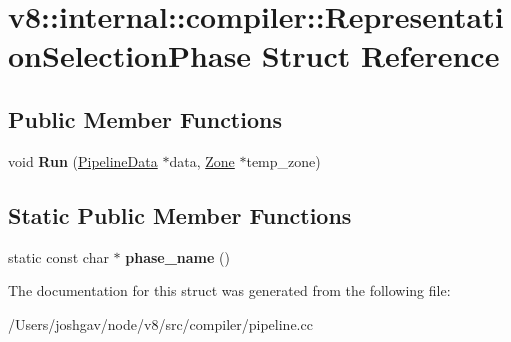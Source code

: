 \hypertarget{structv8_1_1internal_1_1compiler_1_1_representation_selection_phase}{}\section{v8\+:\+:internal\+:\+:compiler\+:\+:Representation\+Selection\+Phase Struct Reference}
\label{structv8_1_1internal_1_1compiler_1_1_representation_selection_phase}
\subsection*{Public Member Functions}
\begin{DoxyCompactItemize}
\item 
void {\bfseries Run} (\hyperlink{classv8_1_1internal_1_1compiler_1_1_pipeline_data}{Pipeline\+Data} $\ast$data, \hyperlink{classv8_1_1internal_1_1_zone}{Zone} $\ast$temp\+\_\+zone)\hypertarget{structv8_1_1internal_1_1compiler_1_1_representation_selection_phase_a713161ffc5226037cfd7c2b0943708a5}{}\label{structv8_1_1internal_1_1compiler_1_1_representation_selection_phase_a713161ffc5226037cfd7c2b0943708a5}

\end{DoxyCompactItemize}
\subsection*{Static Public Member Functions}
\begin{DoxyCompactItemize}
\item 
static const char $\ast$ {\bfseries phase\+\_\+name} ()\hypertarget{structv8_1_1internal_1_1compiler_1_1_representation_selection_phase_a696fa4f0ac9168e6e6efe0a46ed0009d}{}\label{structv8_1_1internal_1_1compiler_1_1_representation_selection_phase_a696fa4f0ac9168e6e6efe0a46ed0009d}

\end{DoxyCompactItemize}


The documentation for this struct was generated from the following file\+:\begin{DoxyCompactItemize}
\item 
/\+Users/joshgav/node/v8/src/compiler/pipeline.\+cc\end{DoxyCompactItemize}
